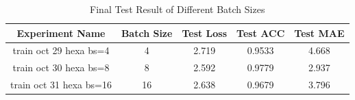 \begin{table}[H]
    \centering
    \begin{tabular}{|c|c|c|c|c|}
        \hline
         Experiment Name& Batch Size & Test Loss & Test ACC & Test MAE\\
         \hline
         train oct 29 hexa bs=4& 4 & 2.719 & 0.9533 & 4.668\\
         \hline
         train oct 30 hexa bs=8& 8 & 2.592 & 0.9779 & 2.937\\
         \hline
         train oct 31 hexa bs=16& 16 & 2.638 & 0.9679 & 3.796\\
         \hline
    \end{tabular}
    \caption{Final Test Result of Different Batch Sizes}
\end{table}



